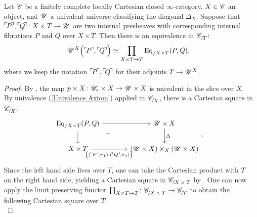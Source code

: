 \documentclass[twoside,a4paper,11pt]{amsart}
\begin{document}
\begin{lemma}\label{Lemma: path in fibered universe are equivalences over the base}
    Let $\mathscr{C}$ be a finitely complete locally Cartesian closed $\infty$-category, $X\in\mathscr{C}$ an object, and $\mathscr{U}$ a univalent universe classifying the diagonal $\Delta_X$. Suppose that $\corner{P},\corner{Q}\colon X\times T\to\U$ are two internal presheaves with corresponding internal fibrations $P$ and $Q$ over $X\times T$. Then there is an equivalence in $\slice{\C}{T}$:
     \[\U^X\Big(\corner{P},\corner{Q}\Big)\simeq \prod_{X\times T\to T}\Eq_{/X\times T}(P,Q),\]
     where we keep the notation $\corner{P},\corner{Q}$ for their adjoints $T\to \mathscr{U}^X$.
\end{lemma}
\begin{proof}
    By \cite[§1, Item (19)]{Rasekh_TheoryElementaryHigherToposes}, the map $p\times X\colon\mathscr{U}_\ast\times X\to \mathscr{U}\times X$ is univalent in the slice over $X$. By univalence (\cref{Univalence Axiom}) applied in $\slice{\C}{X}$, there is a Cartesian square in $\slice{\C}{X}$:
\[\begin{tikzcd}[column sep=large]
    {\Eq_{/X \times T}(P,Q)} \arrow[r] \arrow[d] \arrow[dr, phantom, "\lrcorner"{anchor=center, pos=0.125}] & {\U \times X} \arrow[d, "\Delta"] \\
    {X\times T} \arrow[r, "{\big((\corner{P},\pi_1), (\corner{Q}, \pi_1)\big)}"'] & {(\U \times X) \times_X (\U \times X)}
\end{tikzcd}.\]
Since the left hand side lives over $T$, one can take the Cartesian product with $T$ on the right hand side, yielding a Cartesian square in $\slice{\C}{X\times T}$ by . One can now apply the limit preserving functor $\prod_{X\times T\to T}\colon \slice{\C}{X\times T}\to\slice{\C}{T}$ to obtain the following Cartesian square over $T$:
\begin{equation}\label{Cartesian square: path space in U^X}

\end{equation}
\end{proof}
\end{document}
